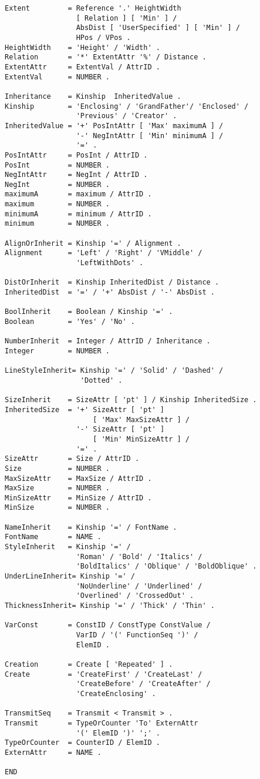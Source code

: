 \begin{verbatim}
Extent         = Reference '.' HeightWidth
                 [ Relation ] [ 'Min' ] /
                 AbsDist [ 'UserSpecified' ] [ 'Min' ] /
                 HPos / VPos .
HeightWidth    = 'Height' / 'Width' .
Relation       = '*' ExtentAttr '%' / Distance .
ExtentAttr     = ExtentVal / AttrID .
ExtentVal      = NUMBER .

Inheritance    = Kinship  InheritedValue .
Kinship        = 'Enclosing' / 'GrandFather'/ 'Enclosed' /
                 'Previous' / 'Creator' .
InheritedValue = '+' PosIntAttr [ 'Max' maximumA ] /
                 '-' NegIntAttr [ 'Min' minimumA ] /
                 '=' .
PosIntAttr     = PosInt / AttrID .
PosInt         = NUMBER .
NegIntAttr     = NegInt / AttrID .
NegInt         = NUMBER .
maximumA       = maximum / AttrID .
maximum        = NUMBER .
minimumA       = minimum / AttrID .
minimum        = NUMBER .

AlignOrInherit = Kinship '=' / Alignment .
Alignment      = 'Left' / 'Right' / 'VMiddle' /
                 'LeftWithDots' .

DistOrInherit  = Kinship InheritedDist / Distance .
InheritedDist  = '=' / '+' AbsDist / '-' AbsDist .

BoolInherit    = Boolean / Kinship '=' .
Boolean        = 'Yes' / 'No' .

NumberInherit  = Integer / AttrID / Inheritance .
Integer        = NUMBER .

LineStyleInherit= Kinship '=' / 'Solid' / 'Dashed' /
                  'Dotted' .

SizeInherit    = SizeAttr [ 'pt' ] / Kinship InheritedSize .
InheritedSize  = '+' SizeAttr [ 'pt' ]
                     [ 'Max' MaxSizeAttr ] /
                 '-' SizeAttr [ 'pt' ]
                     [ 'Min' MinSizeAttr ] /
                 '=' .
SizeAttr       = Size / AttrID .
Size           = NUMBER .
MaxSizeAttr    = MaxSize / AttrID .
MaxSize        = NUMBER .
MinSizeAttr    = MinSize / AttrID .
MinSize        = NUMBER .

NameInherit    = Kinship '=' / FontName .
FontName       = NAME .
StyleInherit   = Kinship '=' /
                 'Roman' / 'Bold' / 'Italics' / 
                 'BoldItalics' / 'Oblique' / 'BoldOblique' .
UnderLineInherit= Kinship '=' /
                 'NoUnderline' / 'Underlined' / 
                 'Overlined' / 'CrossedOut' .
ThicknessInherit= Kinship '=' / 'Thick' / 'Thin' .

VarConst       = ConstID / ConstType ConstValue /
                 VarID / '(' FunctionSeq ')' /
                 ElemID .

Creation       = Create [ 'Repeated' ] .
Create         = 'CreateFirst' / 'CreateLast' /
                 'CreateBefore' / 'CreateAfter' /
                 'CreateEnclosing' .

TransmitSeq    = Transmit < Transmit > .
Transmit       = TypeOrCounter 'To' ExternAttr
                 '(' ElemID ')' ';' .
TypeOrCounter  = CounterID / ElemID .
ExternAttr     = NAME .

END
\end{verbatim}

